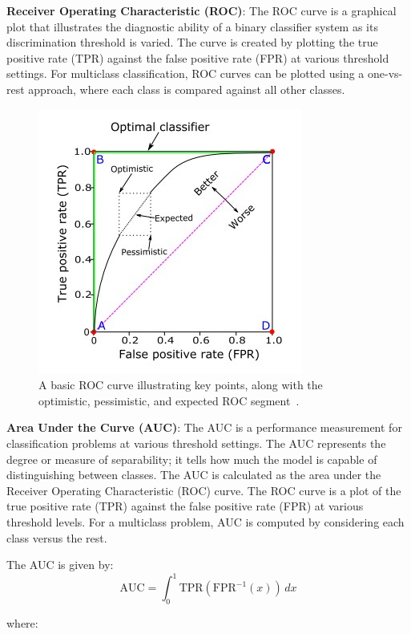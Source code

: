 \textbf{Receiver Operating Characteristic (ROC)}: The ROC curve is a graphical plot that illustrates the diagnostic ability of a binary classifier system as its discrimination threshold is varied. The curve is created by plotting the true positive rate (TPR) against the false positive rate (FPR) at various threshold settings. For multiclass classification, ROC curves can be plotted using a one-vs-rest approach, where each class is compared against all other classes.

\begin{figure}[H]
    \centering    \includegraphics[scale=0.8]{Images/roc_curve.jpg}
    \caption{A basic ROC curve illustrating key points, along with the optimistic, pessimistic, and expected ROC segment~\cite{ClassificationMetrics}.}
    \label{fig:roc_curve}
\end{figure}


\textbf{Area Under the Curve (AUC)}: The AUC is a performance measurement for classification problems at various threshold settings. The AUC represents the degree or measure of separability; it tells how much the model is capable of distinguishing between classes. The AUC is calculated as the area under the Receiver Operating Characteristic (ROC) curve. The ROC curve is a plot of the true positive rate (TPR) against the false positive rate (FPR) at various threshold levels. For a multiclass problem, AUC is computed by considering each class versus the rest.

The AUC is given by:
\begin{equation}
    \text{AUC} = \int_{0}^{1} \text{TPR}(\text{FPR}^{-1}(x)) \, dx
\end{equation}

where:

